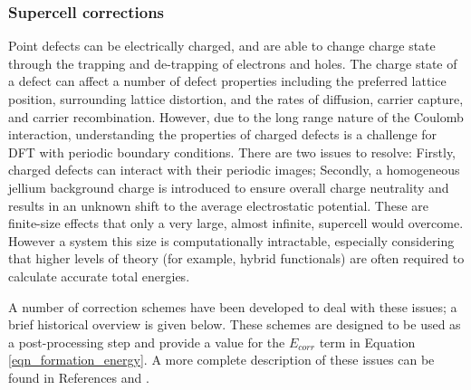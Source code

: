 \subsubsection{Supercell corrections} \label{corrections}
Point defects can be electrically charged, and are able to change charge state through the trapping and de-trapping of electrons and holes. 
The charge state of a defect can affect a number of defect properties including the preferred lattice position, surrounding lattice distortion, and the rates of diffusion, carrier capture, and carrier recombination.
However, due to the long range nature of the Coulomb interaction, understanding the properties of charged defects is a challenge for DFT with periodic boundary conditions.
There are two issues to resolve: 
Firstly, charged defects can interact with their periodic images; 
Secondly, a homogeneous jellium background charge is introduced to ensure overall charge neutrality and results in an unknown shift to the average electrostatic potential. 
These are finite-size effects that only a very large, almost infinite, supercell would overcome.
However a system this size is computationally intractable, especially considering that higher levels of theory (for example, hybrid functionals) are often required to calculate accurate total energies.

A number of correction schemes have been developed to deal with these issues; a brief historical overview is given below. These schemes are designed to be used as a post-processing step and provide a value for the $E_{corr}$ term in Equation \ref{eqn_formation_energy}. A more complete description of these issues can be found in References \cite{durrant2018} and \cite{Vinichenko2017}.

